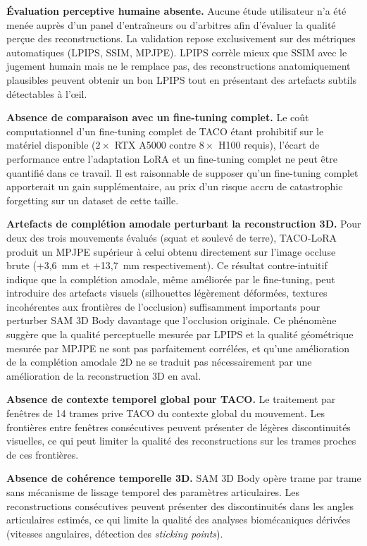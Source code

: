 \textbf{Évaluation perceptive humaine absente.} Aucune étude utilisateur n'a été menée auprès d'un panel d'entraîneurs ou d'arbitres afin d'évaluer la qualité perçue des reconstructions. La validation repose exclusivement sur des métriques automatiques (LPIPS, SSIM, MPJPE). LPIPS corrèle mieux que SSIM avec le jugement humain mais ne le remplace pas, des reconstructions anatomiquement plausibles peuvent obtenir un bon LPIPS tout en présentant des artefacts subtils détectables à l'œil.

\textbf{Absence de comparaison avec un fine-tuning complet.} Le coût computationnel d'un fine-tuning complet de TACO étant prohibitif sur le matériel disponible ($2 \times$ RTX A5000 contre $8 \times$ H100 requis), l'écart de performance entre l'adaptation LoRA et un fine-tuning complet ne peut être quantifié dans ce travail. Il est raisonnable de supposer qu'un fine-tuning complet apporterait un gain supplémentaire, au prix d'un risque accru de catastrophic forgetting sur un dataset de cette taille.

\textbf{Artefacts de complétion amodale perturbant la reconstruction 3D.} Pour deux des trois mouvements évalués (squat et soulevé de terre), TACO-LoRA produit un MPJPE supérieur à celui obtenu directement sur l'image occluse brute (+3,6~mm et +13,7~mm respectivement). Ce résultat contre-intuitif indique que la complétion amodale, même améliorée par le fine-tuning, peut introduire des artefacts visuels (silhouettes légèrement déformées, textures incohérentes aux frontières de l'occlusion) suffisamment importants pour perturber SAM 3D Body davantage que l'occlusion originale. Ce phénomène suggère que la qualité perceptuelle mesurée par LPIPS et la qualité géométrique mesurée par MPJPE ne sont pas parfaitement corrélées, et qu'une amélioration de la complétion amodale 2D ne se traduit pas nécessairement par une amélioration de la reconstruction 3D en aval.

\textbf{Absence de contexte temporel global pour TACO.} Le traitement par fenêtres de 14 trames prive TACO du contexte global du mouvement. Les frontières entre fenêtres consécutives peuvent présenter de légères discontinuités visuelles, ce qui peut limiter la qualité des reconstructions sur les trames proches de ces frontières.

\textbf{Absence de cohérence temporelle 3D.} SAM 3D Body opère trame par trame sans mécanisme de lissage temporel des paramètres articulaires. Les reconstructions consécutives peuvent présenter des discontinuités dans les angles articulaires estimés, ce qui limite la qualité des analyses biomécaniques dérivées (vitesses angulaires, détection des \textit{sticking points}).

